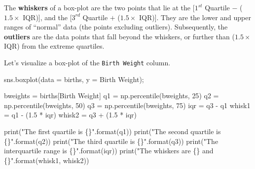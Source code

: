 \documentclass[
  letterpaper,
  DIV=11,
  numbers=noendperiod]{scrreprt}
\newenvironment{Shaded}{\begin{snugshade}}{\end{snugshade}}
\newcommand{\BuiltInTok}[1]{\textcolor[rgb]{0.00,0.23,0.31}{#1}}
\newcommand{\DecValTok}[1]{\textcolor[rgb]{0.68,0.00,0.00}{#1}}
\newcommand{\FloatTok}[1]{\textcolor[rgb]{0.68,0.00,0.00}{#1}}
\newcommand{\NormalTok}[1]{\textcolor[rgb]{0.00,0.23,0.31}{#1}}
\newcommand{\OperatorTok}[1]{\textcolor[rgb]{0.37,0.37,0.37}{#1}}
\newcommand{\SpecialCharTok}[1]{\textcolor[rgb]{0.37,0.37,0.37}{#1}}
\newcommand{\StringTok}[1]{\textcolor[rgb]{0.13,0.47,0.30}{#1}}
\begin{document}
The \textbf{whiskers} of a box-plot are the two points that lie at the
{[}\(1^{st}\) Quartile \(-\) (\(1.5\times\) IQR){]}, and the
{[}\(3^{rd}\) Quartile \(+\) (\(1.5\times\) IQR){]}. They are the lower
and upper ranges of ``normal'' data (the points excluding outliers).
Subsequently, the \textbf{outliers} are the data points that fall beyond
the whiskers, or further than (\(1.5 \times\) IQR) from the extreme
quartiles.

Let's visualize a box-plot of the \texttt{Birth\ Weight} column.

\begin{Shaded}
\begin{Highlighting}[]
\NormalTok{sns.boxplot(data }\OperatorTok{=}\NormalTok{ births, y }\OperatorTok{=} \StringTok{\textquotesingle{}Birth Weight\textquotesingle{}}\NormalTok{)}\OperatorTok{;}

\NormalTok{bweights }\OperatorTok{=}\NormalTok{ births[}\StringTok{\textquotesingle{}Birth Weight\textquotesingle{}}\NormalTok{]}
\NormalTok{q1 }\OperatorTok{=}\NormalTok{ np.percentile(bweights, }\DecValTok{25}\NormalTok{)}
\NormalTok{q2 }\OperatorTok{=}\NormalTok{ np.percentile(bweights, }\DecValTok{50}\NormalTok{)}
\NormalTok{q3 }\OperatorTok{=}\NormalTok{ np.percentile(bweights, }\DecValTok{75}\NormalTok{)}
\NormalTok{iqr }\OperatorTok{=}\NormalTok{ q3 }\OperatorTok{{-}}\NormalTok{ q1}
\NormalTok{whisk1 }\OperatorTok{=}\NormalTok{ q1 }\OperatorTok{{-}}\NormalTok{ (}\FloatTok{1.5} \OperatorTok{*}\NormalTok{ iqr)}
\NormalTok{whisk2 }\OperatorTok{=}\NormalTok{ q3 }\OperatorTok{+}\NormalTok{ (}\FloatTok{1.5} \OperatorTok{*}\NormalTok{ iqr)}

\BuiltInTok{print}\NormalTok{(}\StringTok{"The first quartile is }\SpecialCharTok{\{\}}\StringTok{"}\NormalTok{.}\BuiltInTok{format}\NormalTok{(q1))}
\BuiltInTok{print}\NormalTok{(}\StringTok{"The second quartile is }\SpecialCharTok{\{\}}\StringTok{"}\NormalTok{.}\BuiltInTok{format}\NormalTok{(q2))}
\BuiltInTok{print}\NormalTok{(}\StringTok{"The third quartile is }\SpecialCharTok{\{\}}\StringTok{"}\NormalTok{.}\BuiltInTok{format}\NormalTok{(q3))}
\BuiltInTok{print}\NormalTok{(}\StringTok{"The interquartile range is }\SpecialCharTok{\{\}}\StringTok{"}\NormalTok{.}\BuiltInTok{format}\NormalTok{(iqr))}
\BuiltInTok{print}\NormalTok{(}\StringTok{"The whiskers are }\SpecialCharTok{\{\}}\StringTok{ and }\SpecialCharTok{\{\}}\StringTok{"}\NormalTok{.}\BuiltInTok{format}\NormalTok{(whisk1, whisk2))}
\end{Highlighting}
\end{Shaded}
\end{document}
